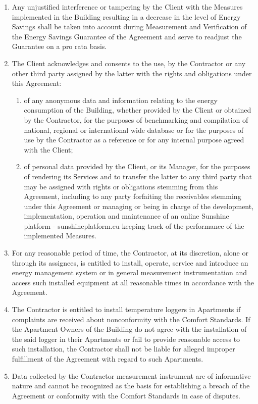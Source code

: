 \begin{multicols}{2}
\begin{enumerate}
	\item	Any unjustified interference or tampering by the Client with the Measures implemented in the Building resulting in a decrease in the level of Energy Savings shall be taken into account during Measurement and Verification of the Energy Savings Guarantee of the Agreement and serve to readjust the Guarantee on a pro rata basis.
	\item	The Client acknowledges and consents to the use, by the Contractor or any other third party assigned by the latter with the rights and obligations under this Agreement:
	\begin{enumerate}
		\item	of any anonymous data and information relating to the energy consumption of the Building, whether provided by the Client or obtained by the Contractor, for the purposes of benchmarking and compilation of national, regional or international wide database or for the purposes of use by the Contractor as a reference or for any internal purpose agreed with the Client;
		\item	of personal data provided by the Client, or its Manager, for the purposes of rendering its Services and to transfer the latter to any third party that may be assigned with rights or obligations stemming from this Agreement, including to any party forfaiting the receivables stemming under this Agreement or managing or being in charge of the development, implementation, operation and maintenance of an online Sunshine platform - sunshineplatform.eu keeping track of the performance of the implemented Measures.
	\end{enumerate}
	\item	For any reasonable period of time, the Contractor, at its discretion, alone or through its assignees, is entitled to install, operate, service and introduce an energy management system or in general measurement instrumentation and access such installed equipment at all reasonable times in accordance with the Agreement.
	\item	The Contractor is entitled to install temperature loggers in Apartments if complaints are received about nonconformity with the Comfort Standards. If the Apartment Owners of the Building do not agree with the installation of the said logger in their Apartments or fail to provide reasonable access to such installation, the Contractor shall not be liable for alleged improper fulfillment of the Agreement with regard to such Apartments.
	\item	Data collected by the Contractor measurement instrument are of informative nature and cannot be recognized as the basis for establishing a breach of the Agreement or conformity with the Comfort Standards in case of disputes.
\end{enumerate}


\end{multicols}

